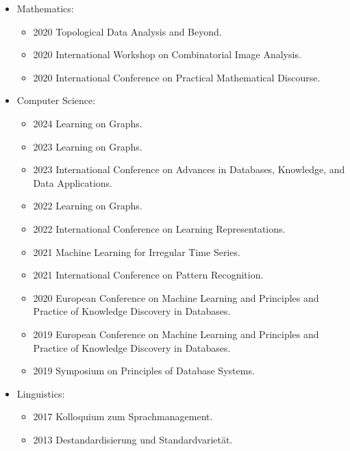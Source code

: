 \documentclass[a4paper, 11pt]{article}
\newcommand{\years}[1]{\marginnote{\scriptsize #1}}
\begin{document}
	\years{Conferences}
	\vspace{-10pt}
	\begin{itemize}[noitemsep, leftmargin=*]
		\item Mathematics:
			\begin{itemize}[noitemsep, leftmargin=*]
				\item 2020 Topological Data Analysis and Beyond.

				\item 2020 International Workshop on Combinatorial Image Analysis.

				\item 2020 International Conference on Practical Mathematical Discourse.
			\end{itemize}

		\item Computer Science:
			\begin{itemize}[noitemsep, leftmargin=*]
				\item 2024 Learning on Graphs.

				\item 2023 Learning on Graphs.

				\item 2023 International Conference on Advances in Databases, Knowledge,
					and Data Applications.

				\item 2022 Learning on Graphs.

				\item 2022 International Conference on Learning Representations.

				\item 2021 Machine Learning for Irregular Time Series.

				\item 2021 International Conference on Pattern Recognition.

				\item 2020 European Conference on Machine Learning and Principles and Practice
					of Knowledge Discovery in Databases.

				\item 2019 European Conference on Machine Learning and Principles and Practice
					of Knowledge Discovery in Databases.

				\item 2019 Symposium on Principles of Database Systems.
			\end{itemize}

		\item Linguistics:
			\begin{itemize}[noitemsep, leftmargin=*]
				\item 2017 Kolloquium zum Sprachmanagement.

				\item 2013 Destandardisierung und Standardvarietät.
			\end{itemize}
	\end{itemize}
	\vspace{10pt}
\end{document}
